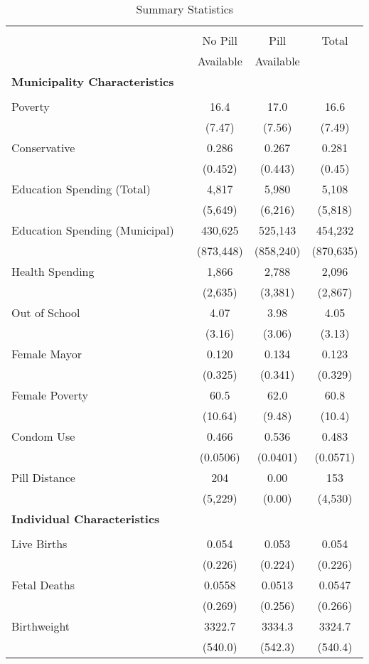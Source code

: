 \begin{table}[htpb!] \centering
\caption{Summary Statistics} \label{TEENtab:SumStats}
\begin{tabular} {@{\extracolsep{5pt}}lp{3mm}ccc}\\ [-1.8ex]
\hline\hline\\ [-1.8ex] &&No Pill&Pill&Total \\
&&Available&Available& \\ \midrule 
\multicolumn{5}{l}{\textbf{Municipality Characteristics}} \\
&&&& \\
Poverty &&16.4&17.0&16.6\\
&&(7.47)&(7.56)&(7.49) \\
Conservative &&0.286&0.267&0.281\\
&&(0.452)&(0.443)&(0.45) \\
Education Spending (Total) &&4,817&5,980&5,108\\
&&(5,649)&(6,216)&(5,818) \\
Education Spending (Municipal) &&430,625&525,143&454,232\\
&&(873,448)&(858,240)&(870,635) \\
Health Spending &&1,866&2,788&2,096\\
&&(2,635)&(3,381)&(2,867) \\
Out of School &&4.07&3.98&4.05\\
&&(3.16)&(3.06)&(3.13) \\
Female Mayor &&0.120&0.134&0.123\\
&&(0.325)&(0.341)&(0.329) \\
Female Poverty &&60.5&62.0&60.8\\
&&(10.64)&(9.48)&(10.4) \\
Condom Use &&0.466&0.536&0.483\\
&&(0.0506)&(0.0401)&(0.0571) \\
Pill Distance &&204&0.00&153\\
&&(5,229)&(0.00)&(4,530) \\
\multicolumn{5}{l}{\textbf{Individual Characteristics}}\\
&&&& \\
Live Births &&0.054&0.053&0.054\\
&&(0.226)&(0.224)&(0.226) \\
Fetal Deaths &&0.0558&0.0513&0.0547\\
&&(0.269)&(0.256)&(0.266) \\
Birthweight &&3322.7&3334.3&3324.7\\
&&     (540.0)&     (542.3)&     (540.4)\\

\end{tabular}
\end{table}
